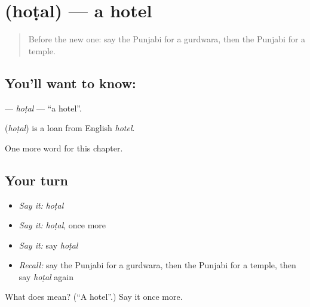 \section[\texorpdfstring{\pa{ਹੋਟਲ} (hoṭal)}{ਹੋਟਲ (hoṭal)}]{ (hoṭal) — a hotel}

\label{lesson:PA-C91-hotal}



\begin{quote}
Before the new one: say the Punjabi for a gurdwara, then the Punjabi for a temple.
\end{quote}

\subsection*{You'll want to know: }
\textbf{} — \emph{hoṭal} — \textquotedblleft{}a hotel\textquotedblright{}.

\begin{cousinweb}
\textbf{} (\emph{hoṭal}) is a loan from English \emph{hotel}.
\end{cousinweb}

\begin{grammarlens}[title={What you've built}]
One more word for this chapter.
\end{grammarlens}

\subsection*{Your turn}
\begin{itemize}
\raggedright
  \item \emph{Say it:} \emph{hoṭal}
  \item \emph{Say it:} \emph{hoṭal}, once more
  \item \emph{Say it:} say \emph{hoṭal}
  \item \emph{Recall:} say the Punjabi for a gurdwara, then the Punjabi for a temple, then say \emph{hoṭal} again
\end{itemize}

\begin{tcolorbox}[breakable,colback=teal!4,colframe=teal!35!black,title={Before you move on}]
What does  mean? (\textquotedblleft{}A hotel\textquotedblright{}.) Say it once more.
\end{tcolorbox}
